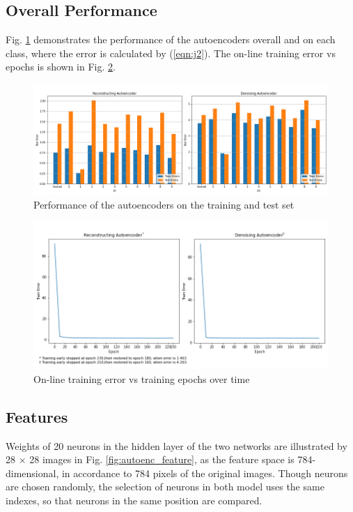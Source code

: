 \documentclass[11pt,titlepage]{article}
\begin{document}
\subsection{Overall Performance}
Fig. \ref{fig:autoenc_test} demonstrates the performance of the autoencoders overall and on each class, where the error is calculated by (\ref{eqn:j2}). The on-line training error vs epochs is shown in Fig. \ref{fig:autoenc_train}. 

\begin{figure}[H]
	\centering
	\includegraphics[width=\linewidth]{img/h4p1_test}
	\caption{Performance of the autoencoders on the training and test set}
	\label{fig:autoenc_test}
\end{figure}

\begin{figure}[H]
	\centering
	\includegraphics[width=\linewidth]{img/h4p1_train}
	\caption{On-line training error vs training epochs over time}
	\label{fig:autoenc_train}
\end{figure}








\subsection{Features}

Weights of 20 neurons in the hidden layer of the two networks are illustrated by 28 $\times$ 28 images in Fig. \ref{fig:autoenc_feature}, as the feature space is 784-dimensional, in accordance to 784 pixels of the original images. Though neurons are chosen randomly, the selection of neurons in both model uses the same indexes, so that neurons in the same position are compared.
\end{document}
